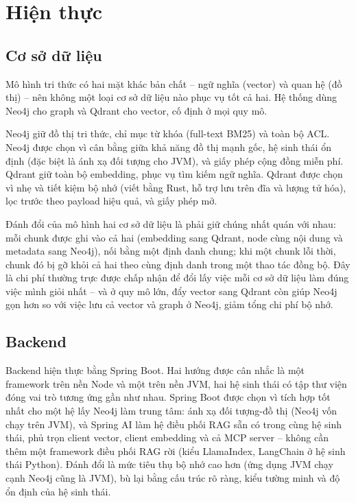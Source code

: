 \section{Hiện thực}


\subsection{Cơ sở dữ liệu}

Mô hình tri thức có hai mặt khác bản chất -- ngữ nghĩa (vector) và quan hệ (đồ thị) -- nên không một loại cơ sở dữ liệu nào phục vụ tốt cả hai. Hệ thống dùng Neo4j cho graph và Qdrant cho vector, cố định ở mọi quy mô.

Neo4j giữ đồ thị tri thức, chỉ mục từ khóa (full-text BM25) và toàn bộ ACL. Neo4j được chọn vì cân bằng giữa khả năng đồ thị mạnh gốc, hệ sinh thái ổn định (đặc biệt là ánh xạ đối tượng cho JVM), và giấy phép cộng đồng miễn phí. Qdrant giữ toàn bộ embedding, phục vụ tìm kiếm ngữ nghĩa. Qdrant được chọn vì nhẹ và tiết kiệm bộ nhớ (viết bằng Rust, hỗ trợ lưu trên đĩa và lượng tử hóa), lọc trước theo payload hiệu quả, và giấy phép mở. 

Đánh đổi của mô hình hai cơ sở dữ liệu là phải giữ chúng nhất quán với nhau: mỗi chunk được ghi vào cả hai (embedding sang Qdrant, node cùng nội dung và metadata sang Neo4j), nối bằng một định danh chung; khi một chunk lỗi thời, chunk đó bị gỡ khỏi cả hai theo cùng định danh trong một thao tác đồng bộ. Đây là chi phí thường trực được chấp nhận để đổi lấy việc mỗi cơ sở dữ liệu làm đúng việc mình giỏi nhất -- và ở quy mô lớn, đẩy vector sang Qdrant còn giúp Neo4j gọn hơn so với việc lưu cả vector và graph ở Neo4j, giảm tổng chi phí bộ nhớ.

\subsection{Backend}

Backend hiện thực bằng Spring Boot. Hai hướng được cân nhắc là một framework trên nền Node và một trên nền JVM, hai hệ sinh thái có tập thư viện đóng vai trò tương ứng gần như nhau. Spring Boot được chọn vì tích hợp tốt nhất cho một hệ lấy Neo4j làm trung tâm: ánh xạ đối tượng-đồ thị (Neo4j vốn chạy trên JVM), và Spring AI làm hệ điều phối RAG sẵn có trong cùng hệ sinh thái, phủ trọn client vector, client embedding và cả MCP server -- không cần thêm một framework điều phối RAG rời (kiểu LlamaIndex, LangChain ở hệ sinh thái Python). Đánh đổi là mức tiêu thụ bộ nhớ cao hơn (ứng dụng JVM chạy cạnh Neo4j cũng là JVM), bù lại bằng cấu trúc rõ ràng, kiểu tường minh và độ ổn định của hệ sinh thái.

